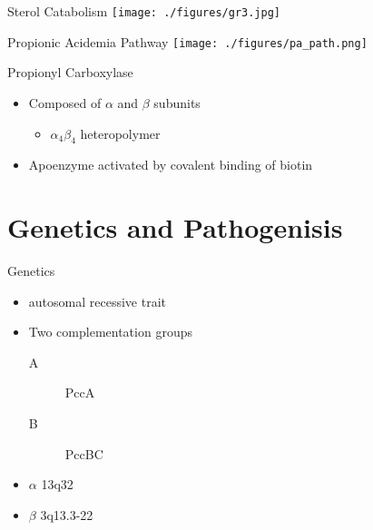 \documentclass[presentation, smaller]{beamer}
\begin{document}
\begin{frame}[label={sec:orgheadline6}]{Sterol Catabolism}
\texttt{[image: ./figures/gr3.jpg]}
\end{frame}
\begin{frame}[label={sec:orgheadline7}]{Propionic Acidemia Pathway}
\texttt{[image: ./figures/pa\_path.png]}
\end{frame}

\begin{frame}[label={sec:orgheadline8}]{Propionyl Carboxylase}
\begin{itemize}
\item Composed of \(\alpha\) and \(\beta\) subunits
\begin{itemize}
\item \(\alpha_{\text{4}} \beta_{\text{4}}\) heteropolymer
\end{itemize}
\item Apoenzyme activated by covalent binding of biotin
\end{itemize}
\end{frame}

\section{Genetics and Pathogenisis}
\label{sec:orgheadline13}

\begin{frame}[label={sec:orgheadline10}]{Genetics}
\begin{itemize}
\item autosomal recessive trait
\item Two complementation groups
\begin{description}
\item[{A}] PccA
\item[{B}] PccBC
\end{description}
\item \(\alpha\) 13q32
\item \(\beta\) 3q13.3-22
\end{itemize}
\end{frame}
\end{document}

